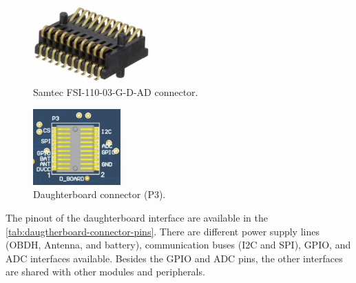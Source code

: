 \begin{figure}[!ht]
    \begin{center}
        \includegraphics[width=0.4\textwidth]{figures/samtec_fsi-110-03-g-d-ad.jpeg}
        \caption{Samtec FSI-110-03-G-D-AD connector.}
        \label{fig:samtec-connector}
    \end{center}
\end{figure}

\begin{figure}[!ht]
    \begin{center}
        \includegraphics[width=0.3\textwidth]{figures/p3-connector.png}
        \caption{Daughterboard connector (P3).}
        \label{fig:daughterboard-connector}
    \end{center}
\end{figure}

The pinout of the daughterboard interface are available in the \autoref{tab:daugtherboard-connector-pins}. There are different power supply lines (OBDH, Antenna, and battery), communication buses (I2C and SPI), GPIO, and ADC interfaces available. Besides the GPIO and ADC pins, the other interfaces are shared with other modules and peripherals.

